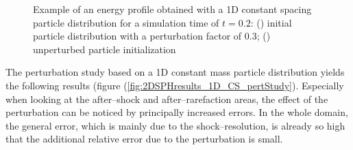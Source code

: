\documentclass{report}
\begin{document}
\begin{figure}[!htbp]

\centering
\label{fig:2DSPHresults_perturbationComparisonProfiles}


\caption[Comparison of perturbed and unperturbed energy profiles]{Example of an energy profile obtained with a 1D constant spacing particle distribution for a simulation time of $t=0.2$: () initial particle distribution with a perturbation factor of $0.3$; () unperturbed particle initialization}

\end{figure}

 The perturbation study based on a 1D constant mass particle distribution yields the following results (figure (\ref{fig:2DSPHresults_1D_CS_pertStudy}). Especially when looking at the after--shock and after--rarefaction areas, the effect of the perturbation can be noticed by principally increased  errors. In the whole domain, the general error, which is mainly due to the shock--resolution, is already so high that the additional relative error due to the perturbation is small.
\end{document}

